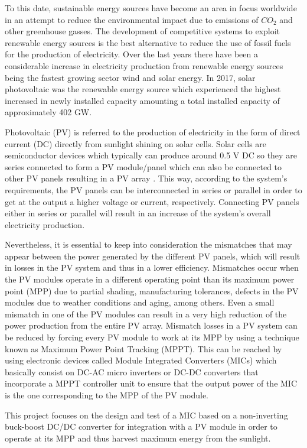 To this date, sustainable energy sources have become an area in focus worldwide in an attempt to reduce the environmental impact due to emissions of $CO_{2}$ and other greenhouse gasses. The development of competitive systems to exploit renewable energy sources is the best alternative to reduce the use of fossil fuels for the production of electricity. Over the last years there have been a considerable increase in electricity production from renewable energy sources being the fastest growing sector wind and solar energy. In 2017, solar photovoltaic was the renewable energy source which experienced the highest increased in newly installed capacity amounting a total installed capacity of approximately 402 GW\cite{global}. %

Photovoltaic (PV) is referred to the production of electricity in the form of direct current (DC) directly from sunlight shining on solar cells. Solar cells are semiconductor devices which typically can produce around 0.5 V DC so they are series connected to form a PV module/panel which can also be connected to other PV panels resulting in a PV array \cite{handbook}. This way, according to the system's requirements, the PV panels can be interconnected in series or parallel in order to get at the output a higher voltage or current, respectively. Connecting PV panels either in series or parallel will result in an increase of the system's overall electricity production. %

Nevertheless, it is essential to keep into consideration the mismatches that may appear between the power generated by the different PV panels, which will result in losses in the PV system and thus in a lower efficiency. Mismatches occur when the PV modules operate in a different operating point than its maximum power point (MPP) due to partial shading, manufacturing tolerances, defects in the PV modules due to weather conditions and aging, among others. Even a small mismatch in one of the PV modules can result in a very high reduction of the power production from the entire PV array. Mismatch losses in a PV system can be reduced by forcing every PV module to work at its MPP by using a technique known as Maximum Power Point Tracking (MPPT). This can be reached by using electronic devices called Module Integrated Converters (MICs) which basically consist on DC-AC micro inverters or DC-DC converters that incorporate a MPPT controller unit to ensure that the output power of the MIC is the one corresponding to the MPP of the PV module.%

This project focuses on the design and test of a MIC based on a non-inverting buck-boost DC/DC converter for integration with a PV module in order to operate at its MPP and thus harvest maximum energy from the sunlight. 
